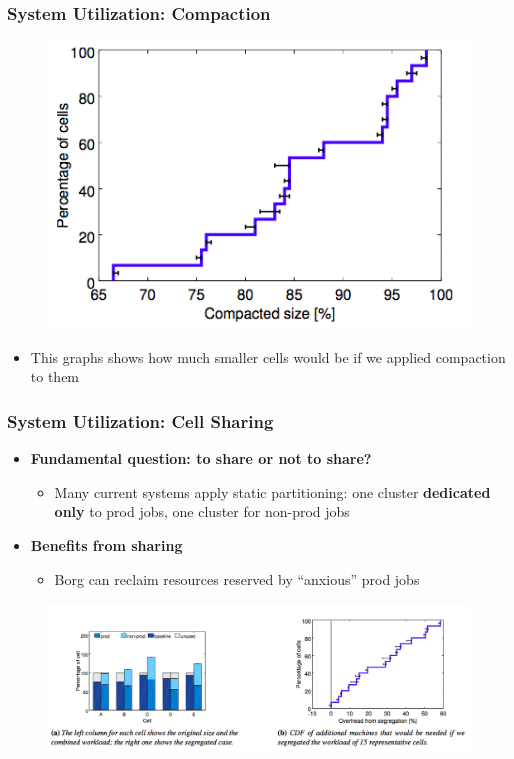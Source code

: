 \begin{frame}
\frametitle{System Utilization: Compaction}
\begin{figure}[h]
  \centering
  \includegraphics[scale=0.4]{./figures/borg_exp_utilization}
  \label{fig:borg_exp_utilization}
\end{figure}
\begin{itemize}
	\item This graphs shows how much smaller cells would be if we applied compaction to them
\end{itemize}
\end{frame}

\begin{frame}
\frametitle{System Utilization: Cell Sharing}
\begin{itemize}
	\item {\bf Fundamental question: to share or not to share?}
	\begin{itemize}
		\item Many current systems apply static partitioning: one cluster {\bf dedicated only} to prod jobs, one cluster for non-prod jobs
	\end{itemize}
	\item {\bf Benefits from sharing}
	\begin{itemize}
		\item Borg can reclaim resources reserved by ``anxious'' prod jobs 
	\end{itemize}
\end{itemize}
\begin{figure}[h]
  \centering
  \includegraphics[scale=0.3]{./figures/borg_exp_sharing}
  \label{fig:borg_exp_sharing}
\end{figure}
\end{frame}

